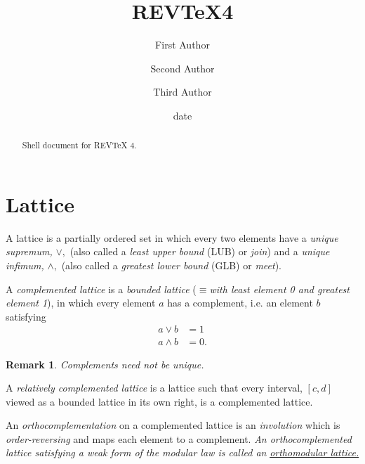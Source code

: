 \documentclass[aps,preprint]{revtex4}%
\newtheorem{remark}[theorem]{Remark}
\begin{document}
\title[Short title for running header]{REV\TeX4}
\author{First Author}
\author{Second Author}
\author{Third Author}

\begin{abstract}
Shell document for REV\TeX{} 4.

\end{abstract}
\date[Date text]{date}




\maketitle
\tableofcontents


\section{Lattice}

A lattice is a partially ordered set in which every two elements have a
\emph{unique supremum, }$\vee,$ (also called a \emph{least upper bound} (LUB)
or \emph{join}) and a \emph{unique infimum, }$\wedge,$ (also called a
\emph{greatest lower bound} (GLB) or \emph{meet}).

A \emph{complemented lattice} is a \emph{bounded lattice} ($\equiv$\emph{with
least element 0 and greatest element 1}), in which every element $a$ has a
complement, i.e. an element $b$ satisfying
\begin{align}
a\vee b &  =1\\
a\wedge b &  =0.
\end{align}


\begin{remark}
Complements need not be unique.
\end{remark}

A \emph{relatively complemented lattice} is a lattice such that every
interval, $[c,d]$ viewed as a bounded lattice in its own right, is a
complemented lattice.

An \emph{orthocomplementation }on a complemented lattice is an
\emph{involution }which is \emph{order-reversing} and maps each element to a
complement. \emph{An orthocomplemented lattice satisfying a weak form of the
modular law is called an }\underline{\emph{orthomodular lattice.}}
\end{document}
